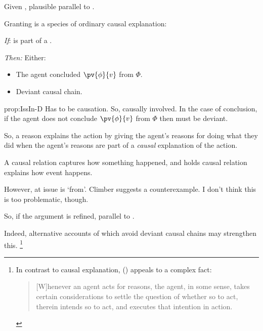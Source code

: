 \begin{note}
  Given \citeauthor{Davidson:1963aa}, plausible parallel to \issueInclusion{}.

  \begin{observation}
    \label{prop:IssIn-D}
    Granting \rationalisation{} is a species of ordinary causal explanation:
    \begin{itenum}
    \item[\emph{If}:]
       is part of a \rationalisation{}.
    \item[\emph{Then:}]
      Either:
      \begin{itemize}
      \item
        The agent concluded \(\pv{\phi}{v}\) from \(\Phi\).
      \item
        Deviant causal chain.
      \end{itemize}
    \end{itenum}
  \end{observation}

  \begin{motivation}{prop:IssIn-D}
    Has to be causation.
    So, causally involved.
    In the case of conclusion, if the agent does not conclude \(\pv{\phi}{v}\) from \(\Phi\) then must be deviant.

    So, a reason explains the action by giving the agent's reasons for doing what they did when the agent's reasons are part of a \emph{causal} explanation of the action.%

    A causal relation captures how something happened, and \citeauthor{Davidson:1963aa} holds causal relation explains how event happens.

    However, at issue is `from'.
    Climber suggests a counterexample.
    I don't think this is too problematic, though.
  \end{motivation}

  So, if the argument is refined, parallel to \issueInclusion{}.

  Indeed, alternative accounts of  which avoid deviant causal chains may strengthen this.%
  \footnote{
    In contrast to causal explanation, \citeauthor{Hieronymi:2011aa} (\citeyear{Hieronymi:2011aa}) appeals to a complex fact:%
    \begin{quote}
      [W]henever an agent acts for reasons, the agent, in some sense, takes certain considerations to settle the question of whether so to act, therein intends so to act, and executes that intention in action.


\end{quote}}
\end{note}
